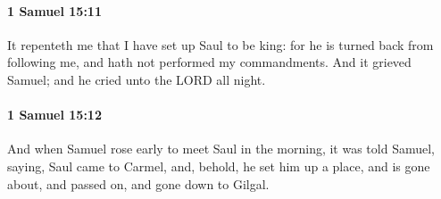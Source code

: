 		\paragraph{1 Samuel 15:11} %
			\label{1SAMUEL-15-11}

			It repenteth me that I have set up Saul to be king: for he is turned back from following me, and hath not performed my commandments. And it grieved Samuel; and he cried unto the LORD all night.


		\paragraph{1 Samuel 15:12} %
			\label{1SAMUEL-15-12}

			And when Samuel rose early to meet Saul in the morning, it was told Samuel, saying, Saul came to Carmel, and, behold, he set him up a place, and is gone about, and passed on, and gone down to Gilgal.

